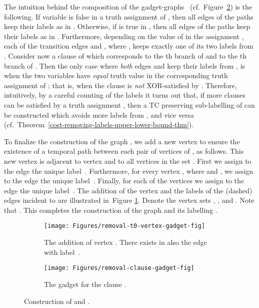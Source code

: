 \documentclass[a4paper,UKenglish]{article}
\begin{document}
The intuition behind the composition of the gadget-graphs~ 
(cf.~Figure~\ref{removal-clause-gadget-fig}) is the following. 
If variable  is false in a truth assignment  of , 
then all edges of the paths  keep their labels as in . 
Otherwise, if  is true in , 
then all edges of the paths  keep their labels as in . 
Furthermore, depending on the value of  in the assignment , 
each of the transition edges  and , 
where , keeps exactly one of its two labels from . 
Consider now a clause  of  which corresponds to the 
th branch of  and to the th branch of . 
Then the only case where \emph{both} edges 
 and  keep their labels from ,
is when the two variables  have \emph{equal} truth value in the 
corresponding truth assignment  of ; 
that is, when the clause  is \emph{not} XOR-satisfied by . 
Therefore, intuitively, by a careful counting of the labels it turns out that, if more clauses can be satisfied by a truth assignment , then a TC preserving sub-labelling  of  can be constructed which avoids more labels from , and vice versa (cf.~Theorem~\ref{cost-removing-labels-upper-lower-bound-thm}). 








To finalize the construction of the graph , we add a new vertex  to ensure 
the existence of a temporal path between each pair of vertices of , as follows. 
This new vertex  is adjacent to vertex  
and to all vertices in the 
set . First we assign to the edge  the unique label~. Furthermore, for every vertex , where  and , we assign to the
edge  the unique label~. Finally, for each of the vertices  we
assign to the edge  the unique label~. 
The addition of the vertex  and the labels of the (dashed) edges
incident to  are illustrated in~Figure \ref{removal-t0-vertex-gadget-fig}.
Denote the vertex sets , , and . 
Note that . 
This completes the construction of the graph  and its labelling .



\begin{figure}[tbh]
\centering
\begin{subfigure}[t]{.8\linewidth}
\centering \texttt{[image: Figures/removal-t0-vertex-gadget-fig]} \hspace{0,2cm}
\caption{The addition of vertex . There exists in  also the edge  with label~.}
\label{removal-t0-vertex-gadget-fig}
\end{subfigure}
\begin{subfigure}[b]{.8\linewidth}
\centering \texttt{[image: Figures/removal-clause-gadget-fig]}
\caption{The gadget for the clause .}
\label{removal-clause-gadget-fig}
\end{subfigure}
\caption{Construction of  and .}
\label{removal-gadgets-fig}
\end{figure}
\end{document}
